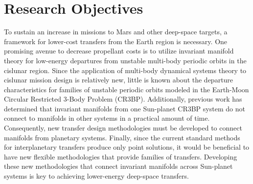 \section{Research Objectives}
To sustain an increase in missions to Mars and other deep-space targets, a framework for lower-cost
transfers from the Earth region is necessary. One promising avenue to decrease propellant costs is
to utilize invariant manifold theory for low-energy departures from unstable multi-body periodic
orbits in the cislunar region. Since the application of multi-body dynamical systems theory to
cislunar mission design is relatively new, little is known about the departure characteristics for
families of unstable periodic orbits modeled in the Earth-Moon Circular Restricted 3-Body Problem
(CR3BP). Additionally, previous work has determined that invariant manifolds from one Sun-planet
CR3BP system do not connect to manifolds in other systems in a practical amount of
time\cite{Koon:2000}. Consequently, new transfer design methodologies must be developed to connect
manifolds from planetary systems. Finally, since the current standard methods for interplanetary
transfers produce only point solutions, it would be beneficial to have new flexible methodologies
that provide families of transfers. Developing these new methodologies that connect invariant
manifolds across Sun-planet systems is key to achieving lower-energy deep-space transfers.

